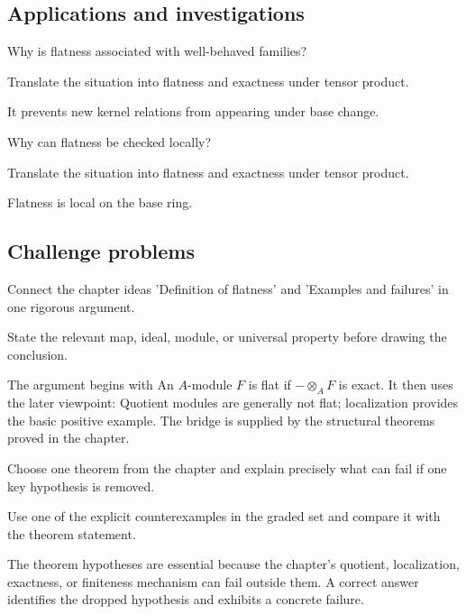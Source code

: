 \subsection*{Applications and investigations}

\begin{exercise}[Families]\label{exr:v14-expand-13}
Why is flatness associated with well-behaved families?
\end{exercise}
\begin{hint}
Translate the situation into flatness and exactness under tensor product.
\end{hint}
\begin{solution}
It prevents new kernel relations from appearing under base change.
\end{solution}

\begin{exercise}\label{exr:v14-expand-14}
Why can flatness be checked locally?
\end{exercise}
\begin{hint}
Translate the situation into flatness and exactness under tensor product.
\end{hint}
\begin{solution}
Flatness is local on the base ring.
\end{solution}

\subsection*{Challenge problems}

\begin{exercise}\label{exr:v14-expand-15}
Connect the chapter ideas 'Definition of flatness' and 'Examples and failures' in one rigorous argument.
\end{exercise}
\begin{hint}
State the relevant map, ideal, module, or universal property before drawing the conclusion.
\end{hint}
\begin{solution}
The argument begins with An $A$-module $F$ is flat if $-\otimes_A F$ is exact. It then uses the later viewpoint: Quotient modules are generally not flat; localization provides the basic positive example. The bridge is supplied by the structural theorems proved in the chapter.
\end{solution}

\begin{exercise}\label{exr:v14-expand-16}
Choose one theorem from the chapter and explain precisely what can fail if one key hypothesis is removed.
\end{exercise}
\begin{hint}
Use one of the explicit counterexamples in the graded set and compare it with the theorem statement.
\end{hint}
\begin{solution}
The theorem hypotheses are essential because the chapter's quotient, localization, exactness, or finiteness mechanism can fail outside them. A correct answer identifies the dropped hypothesis and exhibits a concrete failure.
\end{solution}

